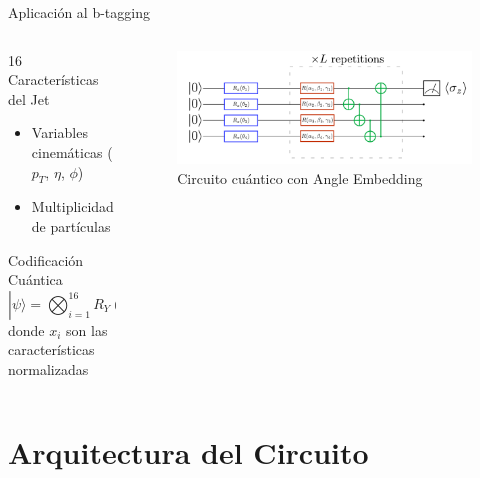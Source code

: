 \documentclass[aspectratio=43]{beamer}
\begin{document}
\begin{frame}{Aplicación al b-tagging}
  \begin{columns}
    \begin{column}{0.45\textwidth}
      \begin{block}{16 Características del Jet}
        \begin{itemize}
          \item Variables cinemáticas (\texorpdfstring{$p_T$}{pT}, \texorpdfstring{$\eta$}{eta}, \texorpdfstring{$\phi$}{phi})
          \item Multiplicidad de partículas
        \end{itemize}
      \end{block}
      \begin{alertblock}{Codificación Cuántica}
        \[ |\psi\rangle = \bigotimes_{i=1}^{16} R_Y(x_i)|0\rangle \]
        donde $x_i$ son las características normalizadas
      \end{alertblock}
    \end{column}
    \begin{column}{0.55\textwidth}
      \begin{figure}
        \includegraphics[width=\textwidth]{angleemb.png}
        \caption{\small Circuito cuántico con Angle Embedding}
      \end{figure}
    \end{column}
  \end{columns}
\end{frame}

\section{Arquitectura del Circuito}
\end{document}
